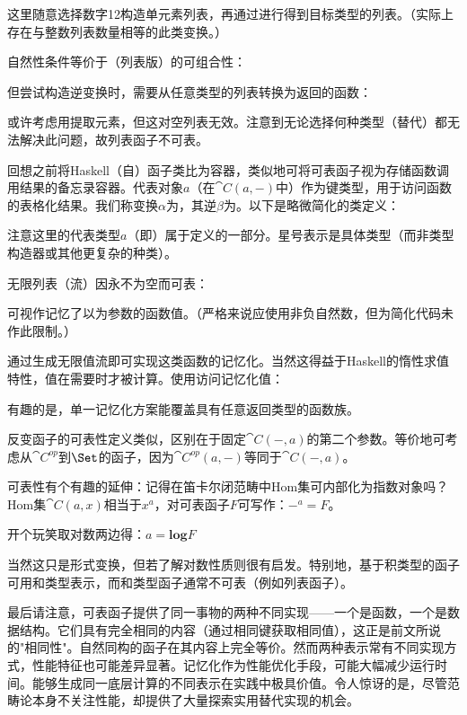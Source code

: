 这里随意选择数字12构造单元素列表，再通过进行得到目标类型的列表。（实际上存在与整数列表数量相等的此类变换。）

自然性条件等价于（列表版）的可组合性：

但尝试构造逆变换时，需要从任意类型的列表转换为返回的函数：

或许考虑用提取元素，但这对空列表无效。注意到无论选择何种类型（替代）都无法解决此问题，故列表函子不可表。

回想之前将Haskell（自）函子类比为容器，类似地可将可表函子视为存储函数调用结果的备忘录容器。代表对象$a$（在$\cat{C}(a, -)$中）作为键类型，用于访问函数的表格化结果。我们称变换$\alpha$为，其逆$\beta$为。以下是略微简化的类定义：

注意这里的代表类型$a$（即）属于定义的一部分。星号表示是具体类型（而非类型构造器或其他更复杂的种类）。

无限列表（流）因永不为空而可表：

可视作记忆了以为参数的函数值。（严格来说应使用非负自然数，但为简化代码未作此限制。）

通过生成无限值流即可实现这类函数的记忆化。当然这得益于Haskell的惰性求值特性，值在需要时才被计算。使用访问记忆化值：

有趣的是，单一记忆化方案能覆盖具有任意返回类型的函数族。

反变函子的可表性定义类似，区别在于固定$\cat{C}(-, a)$的第二个参数。等价地可考虑从$\cat{C}^\mathit{op}$到$\Set$的函子，因为$\cat{C}^\mathit{op}(a, -)$等同于$\cat{C}(-, a)$。

可表性有个有趣的延伸：记得在笛卡尔闭范畴中Hom集可内部化为指数对象吗？Hom集$\cat{C}(a, x)$相当于$x^a$，对可表函子$F$可写作：$-^a = F$。

开个玩笑取对数两边得：$a = \mathbf{log}F$

当然这只是形式变换，但若了解对数性质则很有启发。特别地，基于积类型的函子可用和类型表示，而和类型函子通常不可表（例如列表函子）。

最后请注意，可表函子提供了同一事物的两种不同实现——一个是函数，一个是数据结构。它们具有完全相同的内容（通过相同键获取相同值），这正是前文所说的"相同性"。自然同构的函子在其内容上完全等价。然而两种表示常有不同实现方式，性能特征也可能差异显著。记忆化作为性能优化手段，可能大幅减少运行时间。能够生成同一底层计算的不同表示在实践中极具价值。令人惊讶的是，尽管范畴论本身不关注性能，却提供了大量探索实用替代实现的机会。

